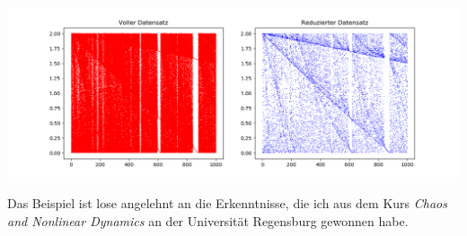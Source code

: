 %
\begin{hintbox}[]
\begin{center}
	\includegraphics[width=.9\linewidth]{./gfx/plt-chaos-reduced}
\end{center}

Das Beispiel ist lose angelehnt an die Erkenntnisse, die ich aus dem Kurs \emph{Chaos and Nonlinear Dynamics} an der Universität Regensburg gewonnen habe.
\end{hintbox}

